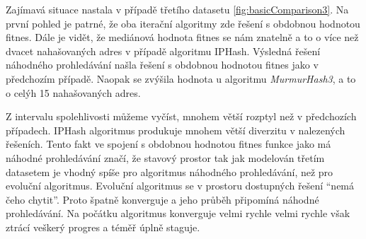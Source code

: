 Zajímavá situace nastala v případě třetího datasetu \ref{fig:basicComparison3}. Na první pohled je patrné,
že oba iterační algoritmy zde řešení s obdobnou hodnotou fitnes. Dále je vidět,
že mediánová hodnota fitnes se nám znatelně a to o více než dvacet nahašovaných 
adres v případě algoritmu IPHash. Výsledná řešení náhodného prohledávání našla
řešení s obdobnou hodnotou fitnes jako v předchozím případě. Naopak se zvýšila 
hodnota u algoritmu \textit{MurmurHash3}, a to o celýh 15 nahašovaných adres.

Z intervalu spolehlivosti můžeme vyčíst, mnohem větší rozptyl než v předchozích
případech. IPHash algoritmus produkuje mnohem větší diverzitu v nalezených řešeních.
Tento fakt ve spojení s obdobnou hodnotou fitnes funkce jako má náhodné prohledávání
značí, že stavový prostor tak jak modelován třetím datasetem je vhodný spíše pro 
algoritmus náhodného prohledávání, než pro evoluční algoritmus. Evoluční algoritmus
se v prostoru dostupných řešení ``nemá čeho chytit''. Proto špatně konverguje a jeho
průběh připomíná náhodné prohledávání. Na počátku algoritmus konverguje velmi rychle
velmi rychle však ztrácí veškerý progres a téměř úplně staguje.

